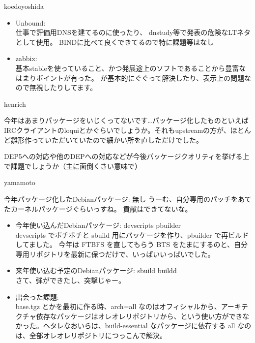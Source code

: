 \begin{prework}{ koedoyoshida }

\begin{itemize}
\item Unbound:\\
仕事で評価用DNSを建てるのに使ったり、
dnstudy等で発表の危険なLTネタとして使用。
BINDに比べて良くできてるので特に課題等はなし
\item zabbix:\\
基本stableを使っていること、かつ発展途上のソフトであることから豊富なはまりポイントが有った。
が基本的にぐぐって解決したり、表示上の問題なので無視したりしてます。
\end{itemize}
\end{prework}

\begin{prework}{ henrich }

今年はあまりパッケージをいじくってないです…パッケージ化したものといえばIRCクライアントのloquiとかぐらいでしょうか。それもupstreamの方が、ほとんど雛形作っていただいていたので細かい所を直しただけでした。

DEP5への対応や他のDEPへの対応などが今後パッケージクオリティを挙げる上で課題でしょうか（主に面倒くさい意味で）
\end{prework}

\begin{prework}{ yamamoto }

今年パッケージ化したDebianパッケージ: 無し
うーむ、自分専用のパッチをあてたカーネルパッケージぐらいっすね。
貢献はできてないな。

\begin{itemize}
\item 今年使い込んだDebianパッケージ: devscripts pbuilder\\
devscripts でポチポチと sbuild 用にパッケージを作り、pbuilder で再ビルドしてました。
今年は FTBFS を直してもらう BTS をたまにするのと、自分専用リポジトリを最新に保つだけで、いっぱいいっぱいでした。

\item 来年使い込む予定のDebianパッケージ: sbuild buildd\\
さて、弾ができたし、突撃じゃー。

\item 出会った課題: \\
base.tgz とかを最初に作る時、arch=all なのはオフィシャルから、アーキテクチャ依存なパッケージはオレオレリポジトリから、という使い方ができなかった。ヘタレなおいらは、build-essential なパッケージに依存する all なのは、全部オレオレリポジトリにつっこんで解決。
\end{itemize}
\end{prework}

